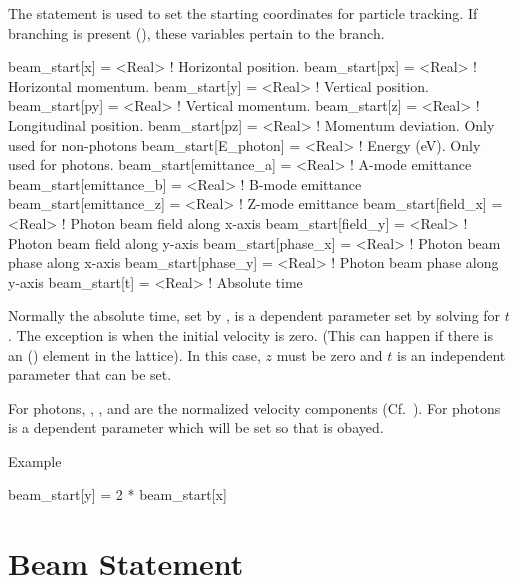 The  statement is used to set the starting coordinates
for particle tracking. If branching is present (), these variables
pertain to the  branch.
\begin{example}
  beam_start[x]           = <Real>   ! Horizontal position.
  beam_start[px]          = <Real>   ! Horizontal momentum.
  beam_start[y]           = <Real>   ! Vertical position.
  beam_start[py]          = <Real>   ! Vertical momentum.
  beam_start[z]           = <Real>   ! Longitudinal position.
  beam_start[pz]          = <Real>   ! Momentum deviation. Only used for non-photons
  beam_start[E_photon]    = <Real>   ! Energy (eV). Only used for photons.
  beam_start[emittance_a] = <Real>   ! A-mode emittance
  beam_start[emittance_b] = <Real>   ! B-mode emittance
  beam_start[emittance_z] = <Real>   ! Z-mode emittance
  beam_start[field_x]     = <Real>   ! Photon beam field along x-axis
  beam_start[field_y]     = <Real>   ! Photon beam field along y-axis
  beam_start[phase_x]     = <Real>   ! Photon beam phase along x-axis
  beam_start[phase_y]     = <Real>   ! Photon beam phase along y-axis
  beam_start[t]           = <Real>   ! Absolute time
\end{example}
Normally the absolute time, set by , is a dependent
parameter set by solving  for $t$. The exception is when the
initial velocity is zero. (This can happen if there is an 
() element in the lattice). In this case, $z$ must be
zero and $t$ is an independent parameter that can be set.

For photons, , , and  are the normalized velocity components
(Cf.~). For photons  is a dependent parameter which will be set
so that  is obayed.

Example
\begin{example}
  beam_start[y] = 2 * beam_start[x]
\end{example}

\section{Beam Statement}

